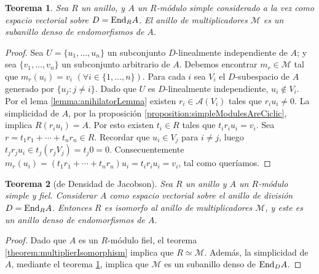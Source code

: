 \documentclass{report}
\newcommand{\End}{\textnormal{End}}
\newtheorem{theorem}{Teorema}
\begin{document}
  \begin{theorem}
    \label{theorem:denseMultiplierRing}
    Sea \(R\) un anillo, y \(A\) un \(R\)-módulo simple considerado a la vez como espacio vectorial sobre \(D = \End_R A\).
    El anillo de multiplicadores \(\mathcal{M}\) es un subanillo denso de endomorfismos de \(A\).
  \end{theorem}
  \begin{proof}
    Sea \(U = \{u_1, \dots, u_n\}\) un subconjunto \(D\)-linealmente independiente de \(A\);
    y sea \(\{v_1, \dots, v_n\}\) un subconjunto arbitrario de \(A\).
    Debemos encontrar \(m_r \in \mathcal{M}\) tal que \(m_r(u_i) = v_i\) \((\forall i \in \{1, \dots, n\})\).
    Para cada \(i\) sea \(V_i\) el \(D\)-subespacio de \(A\) generado por \(\{u_j : j \neq i\}\).
    Dado que \(U\) es \(D\)-linealmente independiente, \(u_i \notin V_i\).
    Por el lema \ref{lemma:anihilatorLemma} existen \(r_i \in \mathcal{A}(V_i)\) tales que \(r_i u_i \neq 0\).
    La simplicidad de \(A\), por la proposición \ref{proposition:simpleModulesAreCiclic}, implica \(R (r_i u_i) = A\).
    Por esto existen \(t_i \in R\) tales que \(t_i r_i u_i = v_i\).
    Sea \(r = t_1 r_1 + \cdots + t_n r_n \in R\).
    Recordar que \(u_i \in V_j\) para \(i \neq j\), luego \(t_j r_j u_i \in t_j (r_j V_j) = t_j 0 = 0\).
    Consecuentemente \(m_r(u_i) = (t_1 r_1 + \cdots + t_n r_n) u_i = t_i r_i u_i = v_i\), tal como queríamos.
  \end{proof}

  \begin{theorem}[de Densidad de Jacobson]
    \label{theorem:jacobsonDensityTheorem}
    Sea \(R\) un anillo y \(A\) un \(R\)-módulo simple y fiel.
    Considerar \(A\) como espacio vectorial sobre el anillo de división \(D = \End_R A\).
    Entonces \(R\) es isomorfo al anillo de multiplicadores \(\mathcal{M}\), y este es un anillo denso de endomorfismos de \(A\).
  \end{theorem}
  \begin{proof}
    Dado que \(A\) es un \(R\)-módulo fiel, el teorema \ref{theorem:multiplierIsomorphism} implica que \(R \simeq \mathcal{M}\).
    Además, la simplicidad de \(A\), mediante el teorema \ref{theorem:denseMultiplierRing}, implica que \(\mathcal{M}\) es un subanillo denso de \(\End_D A\).
  \end{proof}
\end{document}
